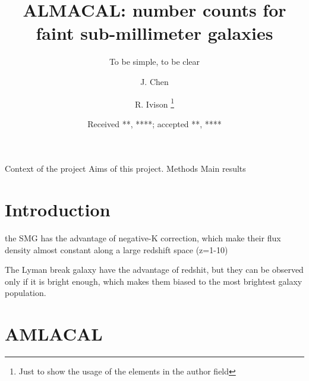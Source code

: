 \documentclass{aa}
\begin{document}
 


   \title{ALMACAL: number counts for faint sub-millimeter galaxies}

   \subtitle{To be simple, to be clear}

   \author{J. Chen
          \and
          R. Ivison \fnmsep\thanks{Just to show the usage
          of the elements in the author field}
          }


   \date{Received **, ****; accepted **, ****}

 
  \abstract
   {Context of the project}
   {Aims of this project.}
   {Methods}
   {Main results}
   {}


   \maketitle
%

\section{Introduction}

the SMG has the advantage of negative-K correction, which make their flux density almost constant along a large redshift space (z=1-10)

The Lyman break galaxy have the advantage of redshit, but they can be observed only if it is bright enough, which makes them biased to the most brightest galaxy population.


\section{AMLACAL}
\end{document}
